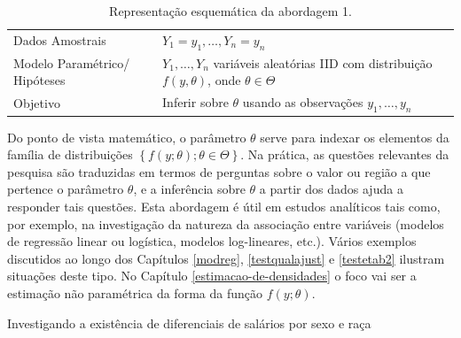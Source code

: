 \documentclass[]{book}
\theoremstyle{definition}
\theoremstyle{definition}
\theoremstyle{definition}
\theoremstyle{remark}
\begin{document}
\begin{longtable}[]{@{}ll@{}}
\caption{\label{tab:modelclass} Representação esquemática da abordagem
1.}\tabularnewline
\toprule
\begin{minipage}[t]{0.29\columnwidth}\raggedright\strut
Dados Amostrais\strut
\end{minipage} & \begin{minipage}[t]{0.60\columnwidth}\raggedright\strut
\(Y_1=y_1,\ldots, Y_n=y_n\)\strut
\end{minipage}\tabularnewline
\begin{minipage}[t]{0.29\columnwidth}\raggedright\strut
Modelo Paramétrico/ Hipóteses\strut
\end{minipage} & \begin{minipage}[t]{0.60\columnwidth}\raggedright\strut
\(Y_1,\ldots,Y_n\) variáveis aleatórias IID com distribuição
\(f(y,\theta)\), onde \(\theta \in \Theta\)\strut
\end{minipage}\tabularnewline
\begin{minipage}[t]{0.29\columnwidth}\raggedright\strut
Objetivo\strut
\end{minipage} & \begin{minipage}[t]{0.60\columnwidth}\raggedright\strut
Inferir sobre \(\theta\) usando as observações \(y_1, \ldots,y_n\)\strut
\end{minipage}\tabularnewline
\bottomrule
\end{longtable}

Do ponto de vista matemático, o parâmetro \(\theta\) serve para indexar
os elementos da família de distribuições
\(\left\{f\left( y;\theta \right);\theta \in \Theta \right\}\). Na
prática, as questões relevantes da pesquisa são traduzidas em termos de
perguntas sobre o valor ou região a que pertence o parâmetro \(\theta\),
e a inferência sobre \(\theta\) a partir dos dados ajuda a responder
tais questões. Esta abordagem é útil em estudos analíticos tais como,
por exemplo, na investigação da natureza da associação entre variáveis
(modelos de regressão linear ou logística, modelos log-lineares, etc.).
Vários exemplos discutidos ao longo dos Capítulos \ref{modreg},
\ref{testqualajust} e \ref{testetab2} ilustram situações deste tipo. No
Capítulo \ref{estimacao-de-densidades} o foco vai ser a estimação não
paramétrica da forma da função \(f(y;\theta)\).

Investigando a existência de diferenciais de salários por sexo e raça
\end{document}
